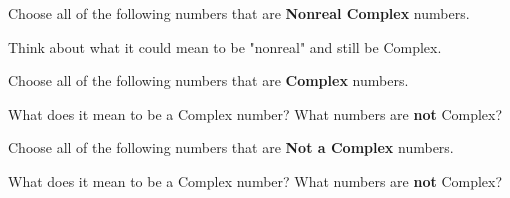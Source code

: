 \documentclass{ximera}
\begin{document}
\begin{exercise}
Choose all of the following numbers that are \textbf{Nonreal Complex} numbers.

\begin{selectAll}
\end{selectAll}

\begin{hint}
Think about what it could mean to be "nonreal" and still be Complex.
\end{hint}

\end{exercise}

\begin{exercise}
Choose all of the following numbers that are \textbf{Complex} numbers.

\begin{selectAll}
\end{selectAll}

\begin{hint}
What does it mean to be a Complex number? What numbers are \textbf{not} Complex?
\end{hint}

\end{exercise}

\begin{exercise}
Choose all of the following numbers that are \textbf{Not a Complex} numbers.

\begin{selectAll}
\end{selectAll}

\begin{hint}
What does it mean to be a Complex number? What numbers are \textbf{not} Complex?
\end{hint}

\end{exercise}
\end{document}
